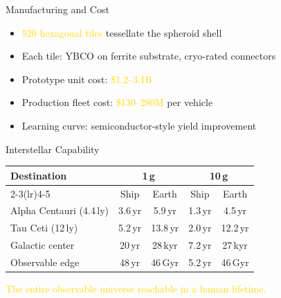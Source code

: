 \documentclass[aspectratio=169,10pt]{beamer}
\begin{document}
\begin{frame}[t]{Manufacturing and Cost}
\vspace{0.5cm}
\begin{itemize}
  \setlength\itemsep{9pt}
  \item \textcolor{gold}{520 hexagonal tiles}
    tessellate the spheroid shell
  \item Each tile: YBCO on ferrite substrate, cryo-rated connectors
  \item Prototype unit cost: \textcolor{gold}{\$1.2--3.1B}
  \item Production fleet cost: \textcolor{gold}{\$130--280M} per vehicle
  \item Learning curve: semiconductor-style yield improvement
\end{itemize}
\end{frame}

\begin{frame}[t]{Interstellar Capability}
\vspace{0.3cm}
\begin{center}
\footnotesize
\begin{tabular}{l c c c c}
  \toprule
  \textbf{Destination} &
    \multicolumn{2}{c}{\textbf{1\,g}} &
    \multicolumn{2}{c}{\textbf{10\,g}} \\
  \cmidrule(lr){2-3}\cmidrule(lr){4-5}
  & Ship & Earth & Ship & Earth \\
  \midrule
  Alpha Centauri (4.4\,ly) & 3.6\,yr & 5.9\,yr & 1.3\,yr & 4.5\,yr \\
  Tau Ceti (12\,ly)        & 5.2\,yr & 13.8\,yr & 2.0\,yr & 12.2\,yr \\
  Galactic center          & 20\,yr  & 28\,kyr & 7.2\,yr & 27\,kyr \\
  Observable edge          & 48\,yr  & 46\,Gyr & 5.2\,yr & 46\,Gyr \\
  \bottomrule
\end{tabular}
\end{center}
\vspace{0.2cm}
\begin{center}
  \small\textcolor{gold}{The entire observable universe
    reachable in a human lifetime.}
\end{center}
\end{frame}

\end{document}
